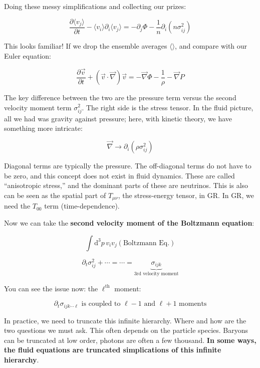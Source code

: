 \documentclass{article}
\newcommand{\be}{\begin{equation}}
\newcommand{\ee}{\end{equation}}
\begin{document}
Doing these messy simplifications and collecting our prizes:

\be
\frac{\partial \langle v_j \rangle}{\partial t} - \langle v_i \rangle \partial_i \langle v_j \rangle = -\partial_j \Phi - \frac{1}{n} \partial_i \left(n\sigma_{ij}^2\right)
\ee

This looks familiar! If we drop the ensemble averages $\langle\rangle$, and compare with our Euler equation:

\be
\frac{\partial \vec{v}}{\partial t} + \left(\vec{v}\cdot \vec{\nabla}\right) \vec{v} = -\vec{\nabla}\Phi - \frac{1}{\rho} - \vec{\nabla} P
\ee

The key difference between the two are the pressure term versus the second velocity moment term $\sigma_{ij}^2$. The right side is the stress tensor. In the fluid picture, all we had was gravity against pressure; here, with kinetic theory, we have something more intricate:

\begin{equation}
    \vec{\nabla} \rightarrow \partial_i \left(\rho \sigma_{ij}^2\right)
\end{equation}

Diagonal terms are typically the pressure. The off-diagonal terms do not have to be zero, and this concept does not exist in fluid dynamics. These are called ``anisotropic stress,'' and the dominant parts of these are neutrinos. This is also can be seen as the spatial part of $T_{\mu\nu}$, the stress-energy tensor, in GR. In GR, we need the $T_{00}$ term (time-dependence). 

Now we can take the \textbf{second velocity moment of the Boltzmann equation}:

\be
\int \mathrm{d}^3p \, v_i v_j \left(\text{Boltzmann Eq.}\right)
\ee

\be\partial_t \sigma_{ij}^2 + \cdots = \cdots = \underbrace{\sigma_{ijk}}_\text{3rd velocity moment}
\ee

You can see the issue now: the $\ell^{\text{th}}$ moment:

\be
\partial_t \sigma_{ijk \cdots \ell} \text{ is coupled to } \ell-1 \text{ and } \ell+1 \text{ moments}
\ee

In practice, we need to truncate this infinite hierarchy. Where and how are the two questions we must ask. This often depends on the particle species. Baryons can be truncated at low order, photons are often a few thousand. \textbf{In some ways, the fluid equations are truncated simplications of this infinite hierarchy}.
\end{document}
